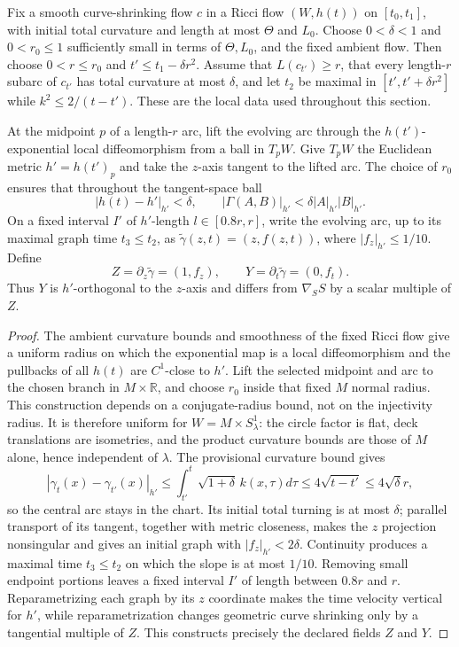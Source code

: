 Fix a smooth curve-shrinking flow $c$ in a Ricci flow $(W,h(t))$ on
$[t_0,t_1]$, with initial total curvature and length at most $\Theta$ and
$L_0$.  Choose $0<\delta<1$ and $0<r_0\le1$ sufficiently small in terms of
$\Theta,L_0$, and the fixed ambient flow.  Then choose $0<r\le r_0$ and
$t'\le t_1-\delta r^2$.  Assume that $L(c_{t'})\ge r$, that every
length-$r$ subarc of $c_{t'}$ has total curvature at most $\delta$, and let
$t_2$ be maximal in $[t',t'+\delta r^2]$ while
$k^2\le2/(t-t')$.  These are the local data used throughout this section.

\begin{definition}
\label{def:curve-flow-local-graph-coordinates}
\notready
At the midpoint $p$ of a length-$r$ arc, lift the evolving arc through the
$h(t')$-exponential local diffeomorphism from a ball in $T_pW$.  Give
$T_pW$ the Euclidean metric $h'=h(t')_p$ and take the $z$-axis tangent to the
lifted arc.  The choice of $r_0$ ensures that throughout the tangent-space
ball
\[
 |h(t)-h'|_{h'}<\delta,\qquad
 |\Gamma(A,B)|_{h'}<\delta|A|_{h'}|B|_{h'}.
\]
On a fixed interval $I'$ of $h'$-length $l\in[0.8r,r]$, write the evolving
arc, up to its maximal graph time $t_3\le t_2$, as
$\widetilde\gamma(z,t)=(z,f(z,t))$, where $|f_z|_{h'}\le1/10$.  Define
\[
 Z=\partial_z\widetilde\gamma=(1,f_z),\qquad
 Y=\partial_t\widetilde\gamma=(0,f_t).
\]
Thus $Y$ is $h'$-orthogonal to the $z$-axis and differs from
$\nabla_SS$ by a scalar multiple of $Z$.
\end{definition}
\begin{proof}
The ambient curvature bounds and smoothness of the fixed Ricci flow give a
uniform radius on which the exponential map is a local diffeomorphism and the
pullbacks of all $h(t)$ are $C^1$-close to $h'$.  Lift the selected midpoint
and arc to the chosen branch in $M\times\mathbb R$, and choose $r_0$ inside
that fixed $M$ normal radius.  This construction depends on a
conjugate-radius bound, not on the injectivity radius.  It is therefore uniform
for $W=M\times S^1_\lambda$: the circle factor is flat, deck translations are
isometries, and the product curvature bounds are those of $M$ alone, hence
independent of $\lambda$.  The provisional curvature
bound gives
\[
 |\gamma_t(x)-\gamma_{t'}(x)|_{h'}
 \le\int_{t'}^t\sqrt{1+\delta}\,k(x,\tau)d\tau
 \le4\sqrt{t-t'}\le4\sqrt\delta r,
\]
so the central arc stays in the chart.  Its initial total turning is at most
$\delta$; parallel transport of its tangent, together with metric closeness,
makes the $z$ projection nonsingular and gives an initial graph with
$|f_z|_{h'}<2\delta$.  Continuity produces a maximal time $t_3\le t_2$ on
which the slope is at most $1/10$.  Removing small endpoint portions leaves a
fixed interval $I'$ of length between $0.8r$ and $r$.  Reparametrizing each
graph by its $z$ coordinate makes the time velocity vertical for $h'$, while
reparametrization changes geometric curve shrinking only by a tangential
multiple of $Z$.  This constructs precisely the declared fields $Z$ and $Y$.
\end{proof}

